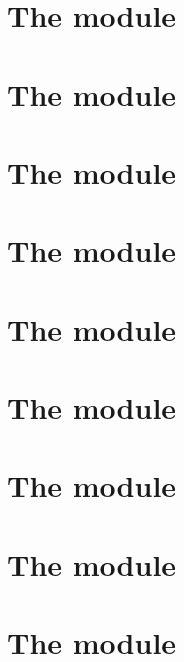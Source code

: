 \documentclass[fleqn]{report}
\newcounter{alu_ext_counter}
\begin{document}
\chapter{The \stpMod{} module \specDeprecated{}}     \label{chap: stp}             \minitoc    
\chapter{The \expMod{} module \specDeprecated{}}     \label{chap: exp}             \minitoc    
\chapter{The \gasMod{} module \specDeprecated{}}     \label{chap: gas}             \minitoc    
\chapter{The \trmMod{} module \specDeprecated{}}     \label{chap: trm}             \minitoc    

\chapter{The \eucMod{} module}                       \label{chap: euc}             \minitoc    
\chapter{The \binMod{} module \specDeprecated{}}     \label{chap: bin}             \minitoc    
\chapter{The \shfMod{} module \specDeprecated{}}     \label{chap: shf}             \minitoc    
\chapter{The \wcpMod{} module \specDeprecated{}}     \label{chap: wcp}             \minitoc    
\chapter{The \btcMod{} module}                       \label{chap: block data}      \minitoc    
\end{document}
